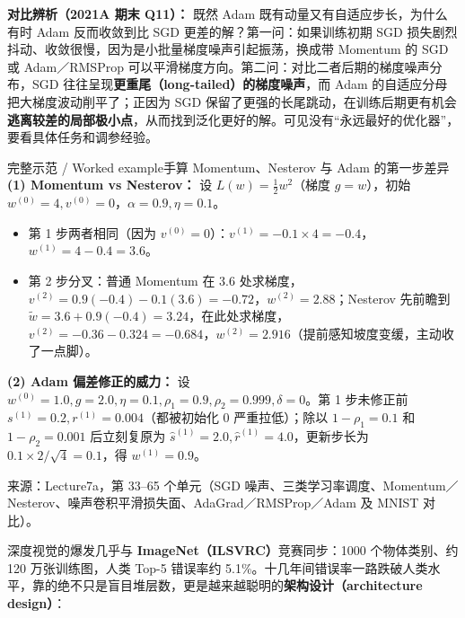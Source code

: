 \textbf{对比辨析（2021A 期末 Q11）：} 既然 Adam 既有动量又有自适应步长，为什么有时 Adam 反而收敛到比 SGD 更差的解？第一问：如果训练初期 SGD 损失剧烈抖动、收敛很慢，因为是小批量梯度噪声引起振荡，换成带 Momentum 的 SGD 或 Adam／RMSProp 可以平滑梯度方向。第二问：对比二者后期的梯度噪声分布，SGD 往往呈现\textbf{更重尾（long-tailed）的梯度噪声}，而 Adam 的自适应分母把大梯度波动削平了；正因为 SGD 保留了更强的长尾跳动，在训练后期更有机会\textbf{逃离较差的局部极小点}，从而找到泛化更好的解。可见没有“永远最好的优化器”，要看具体任务和调参经验。


\begin{StudyBlock}{完整示范 / Worked example}{手算 Momentum、Nesterov 与 Adam 的第一步差异}
\textbf{(1) Momentum vs Nesterov：} 设 $L(w)=\frac{1}{2}w^2$（梯度 $g=w$），初始 $w^{(0)}=4, v^{(0)}=0$，$\alpha=0.9, \eta=0.1$。
\begin{itemize}
\item 第 1 步两者相同（因为 $v^{(0)}=0$）：$v^{(1)} = -0.1\times 4 = -0.4$，$w^{(1)} = 4 - 0.4 = 3.6$。
\item 第 2 步分叉：普通 Momentum 在 $3.6$ 处求梯度，$v^{(2)} = 0.9(-0.4) - 0.1(3.6) = -0.72$，$w^{(2)} = 2.88$；Nesterov 先前瞻到 $\tilde{w} = 3.6 + 0.9(-0.4) = 3.24$，在此处求梯度，$v^{(2)} = -0.36 - 0.324 = -0.684$，$w^{(2)} = 2.916$（提前感知坡度变缓，主动收了一点脚）。
\end{itemize}
\textbf{(2) Adam 偏差修正的威力：} 设 $w^{(0)}=1.0, g=2.0, \eta=0.1, \rho_1=0.9, \rho_2=0.999, \delta=0$。第 1 步未修正前 $s^{(1)}=0.2, r^{(1)}=0.004$（都被初始化 0 严重拉低）；除以 $1-\rho_1=0.1$ 和 $1-\rho_2=0.001$ 后立刻复原为 $\hat{s}^{(1)}=2.0, \hat{r}^{(1)}=4.0$，更新步长为 $0.1\times 2/\sqrt{4} = 0.1$，得 $w^{(1)} = 0.9$。
\end{StudyBlock}

来源：Lecture7a，第 33–65 个单元（SGD 噪声、三类学习率调度、Momentum／Nesterov、噪声卷积平滑损失面、AdaGrad／RMSProp／Adam 及 MNIST 对比）。



深度视觉的爆发几乎与 \textbf{ImageNet（ILSVRC）}竞赛同步：1000 个物体类别、约 120 万张训练图，人类 Top-5 错误率约 5.1\%。十几年间错误率一路跌破人类水平，靠的绝不只是盲目堆层数，更是越来越聪明的\textbf{架构设计（architecture design）}：

